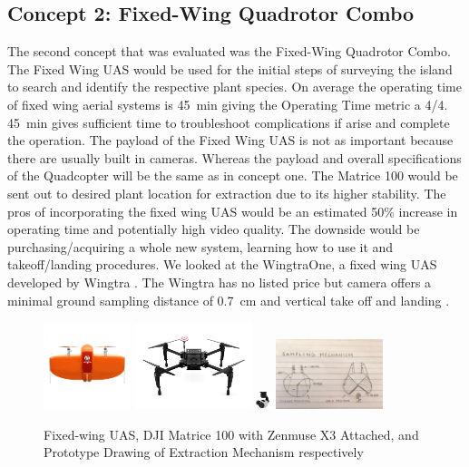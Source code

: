 \documentclass{wrcecapstone}
\begin{document}
\subsection{Concept 2:  Fixed-Wing Quadrotor Combo}
The second concept that was evaluated was the Fixed-Wing Quadrotor Combo. The Fixed Wing UAS would be used for the initial steps of surveying the island to search and identify the respective plant species. On average the operating time of fixed wing aerial systems is \SI{45}{\minute} giving the Operating Time metric a 4/4. \SI{45}{\minute} gives sufficient time to troubleshoot complications if arise and complete the operation. The payload of the Fixed Wing UAS is not as important because there are usually built in cameras. Whereas the payload and overall specifications of the Quadcopter will be the same as in concept one. The Matrice 100  would be sent out to desired plant location for extraction due to its higher stability. The pros of incorporating the fixed wing UAS would be an estimated 50\% increase in operating time and potentially high video quality. The downside would be purchasing/acquiring a whole new system, learning how to use it and takeoff/landing procedures. We looked at the WingtraOne, a fixed wing UAS developed by Wingtra \cite{wingtra2019wingtraone}. The Wingtra has no listed price but camera offers a minimal ground sampling distance of \SI{0.7}{\centi\meter} and vertical take off and landing \cite{wingtra2019wingtraone}. 

\begin{figure}
\begin{center}
\includegraphics[height=1in]{figures/fig421a.png}
\includegraphics[height=1in]{figures/fig421b2.png}
\includegraphics[height=0.2in]{figures/fig421b1.png}
\includegraphics[height=0.8in]{figures/fig421c.jpg}
\end{center}
\caption{Fixed-wing UAS, DJI Matrice 100 with Zenmuse X3 Attached, and Prototype Drawing of Extraction Mechanism respectively  \cite{dronesmadeeasy2019matrice, wingtra2019wingtraone, dji2019zenmuse}}
\label{fig:4.2.1}
\end{figure}
\end{document}
